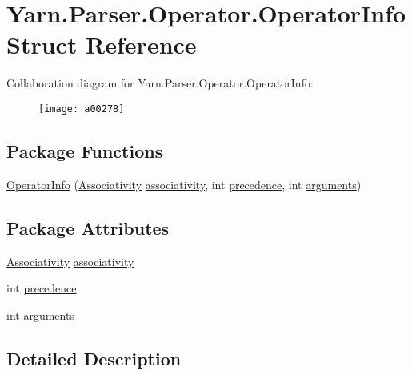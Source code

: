 \hypertarget{a00059}{\section{Yarn.\-Parser.\-Operator.\-Operator\-Info Struct Reference}
\label{a00059}
}


Collaboration diagram for Yarn.\-Parser.\-Operator.\-Operator\-Info\-:
\nopagebreak
\begin{figure}[H]
\begin{center}
\leavevmode
\texttt{[image: a00278]}
\end{center}
\end{figure}
\subsection*{Package Functions}
\begin{DoxyCompactItemize}
\item 
\hyperlink{a00059_a25faca62235c9f8542e4a071ba8ebc0b}{Operator\-Info} (\hyperlink{a00058_a83fa1b8db0e6678006920812b6f33f62}{Associativity} \hyperlink{a00059_accba40a72d9709ca3c18810b8661afe3}{associativity}, int \hyperlink{a00059_a0b2921d7b863e268d33aa15213395093}{precedence}, int \hyperlink{a00059_a0758c6f7dac4b205f616b43b1af95b95}{arguments})
\end{DoxyCompactItemize}
\subsection*{Package Attributes}
\begin{DoxyCompactItemize}
\item 
\hyperlink{a00058_a83fa1b8db0e6678006920812b6f33f62}{Associativity} \hyperlink{a00059_accba40a72d9709ca3c18810b8661afe3}{associativity}
\item 
int \hyperlink{a00059_a0b2921d7b863e268d33aa15213395093}{precedence}
\item 
int \hyperlink{a00059_a0758c6f7dac4b205f616b43b1af95b95}{arguments}
\end{DoxyCompactItemize}


\subsection{Detailed Description}


